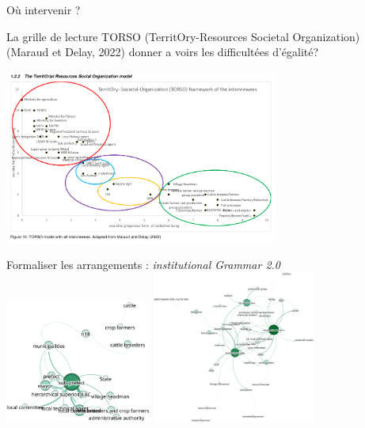 \documentclass[newPxFont]{beamer}
\begin{document}
\begin{frame}[c]{Où intervenir ?}
    \vspace{-1cm}

   La grille de lecture TORSO (TerritOry-Resources Societal Organization) (Maraud et Delay, 2022) donner a voirs les difficultées d'égalité? 
  \begin{center}
   \includegraphics[width=9cm]{img/torso_mathilde.png}
  \end{center}

\end{frame}

\begin{frame}[c]{Formaliser les arrangements : \textit{institutional Grammar 2.0}}
    \vspace{-1cm}
    \includegraphics[height=4cm]{img/sg_agent_Admin.png}
    \includegraphics[height=5cm]{img/sg_popLozc.png}
\end{frame}
\end{document}
